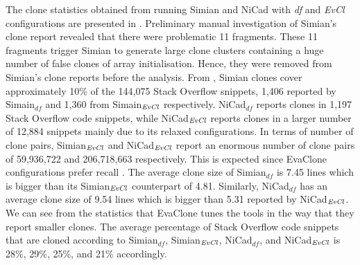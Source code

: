 \documentclass{sig-alternate-05-2015}
\begin{document}
\begin{table}
	\centering
	\caption{Statistics of clones found between Stack Overflow and Qualitas projects using Simian and NiCad}
	\label{tab:raw_stats}
	\small
\end{table}

The clone statistics obtained from running Simian and NiCad with \textit{df} and \textit{EvCl} configurations are presented in . Preliminary manual investigation of Simian's clone report revealed that there were problematic 11 fragments. These 11 fragments trigger Simian to generate large clone clusters containing a huge number of false clones of array initialisation. Hence, they were removed from Simian's clone reports before the analysis. From , Simian clones cover approximately 10\% of the 144,075 Stack Overflow snippets, 1,406 reported by Simain$_{df}$ and 1,360 from Simain$_{\textrm{\textit{EvCl}}}$ respectively. NiCad$_{df}$ reports clones in 1,197 Stack Overflow code snippets, while NiCad$_{\textrm{\textit{EvCl}}}$ reports clones in a larger number of 12,884 snippets  mainly due to its relaxed configurations. In terms of number of clone pairs, Simian$_{\textrm{\textit{EvCl}}}$ and NiCad$_{\textrm{\textit{EvCl}}}$ report an enormous number of clone pairs of 59,936,722 and 206,718,663 respectively. This is expected since EvaClone configurations prefer recall \cite{Wang2013}. The average clone size of Simian$_{df}$ is 7.45 lines which is bigger than its Simian$_{\textrm{\textit{EvCl}}}$ counterpart of 4.81. Similarly, NiCad$_{df}$ has an average clone size of 9.54 lines which is bigger than 5.31 reported by NiCad$_{\textrm{\textit{EvCl}}}$. We can see from the statistics that EvaClone tunes the tools in the way that they report smaller clones. The average percentage of Stack Overflow code snippets that are cloned according to Simian$_{df}$, Simian$_{\textrm{\textit{EvCl}}}$, NiCad$_{df}$, and NiCad$_{\textrm{\textit{EvCl}}}$ is 28\%, 29\%, 25\%, and 21\% accordingly.
\end{document}
